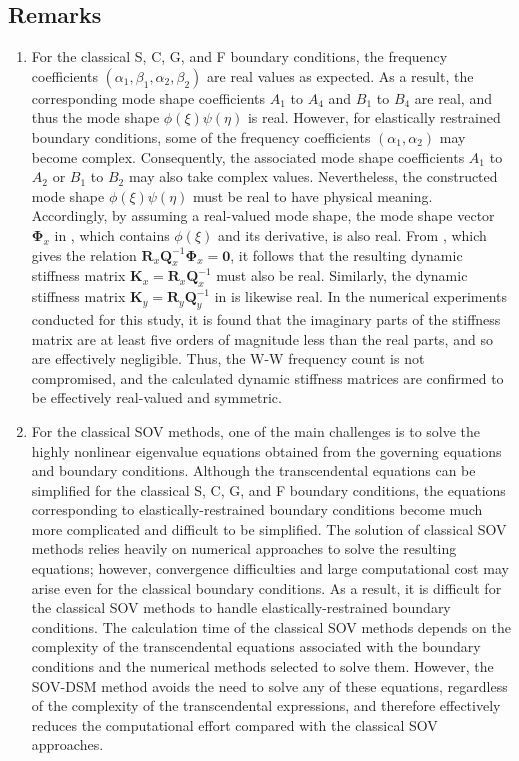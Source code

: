 \documentclass[preprint,12pt,number]{elsarticle}
\begin{document}
\subsection{Remarks}
\begin{enumerate}[label=(\roman*)]
	\item For the classical S, C, G, and F boundary conditions, the frequency coefficients $(\alpha_{1}, \beta_{1}, \alpha_{2}, \beta_{2})$ are real values as expected. 
	As a result, the corresponding mode shape coefficients $A_{1}$ to $A_{4}$ and $B_{1}$ to $B_{4}$ are real, and thus the mode shape $\phi(\xi)\psi(\eta)$ is real.
	However, for elastically restrained boundary conditions, some of the frequency coefficients $(\alpha_{1}, \alpha_{2})$ may become complex. 
	Consequently, the associated mode shape coefficients $A_{1}$ to $A_{2}$ or $B_{1}$ to $B_{2}$ may also take complex values.
	Nevertheless, the constructed mode shape $\phi(\xi)\psi(\eta)$ must be real to have physical meaning. 
	Accordingly, by assuming a real-valued mode shape, the mode shape vector $\mathbf{\Phi}_x$ in , which contains $\phi(\xi)$ and its derivative, is also real. 
	From , which gives the relation $\mathbf{R}_x \mathbf{Q}_x^{-1}\mathbf{\Phi}_x = \mathbf{0}$, it follows that the resulting dynamic stiffness matrix $\mathbf{K}_x = \mathbf{R}_x \mathbf{Q}_x^{-1}$ must also be real. 
	Similarly, the dynamic stiffness matrix $\mathbf{K}_y = \mathbf{R}_y \mathbf{Q}_y^{-1}$ in  is likewise real.
    In the numerical experiments conducted for this study, it is found that the imaginary parts of the stiffness matrix are at least five orders of magnitude less than the real parts, and so are effectively negligible.
    Thus, the W-W frequency count is not compromised, and the calculated dynamic stiffness matrices are confirmed to be effectively real-valued and symmetric.
	
	\item For the classical SOV methods, one of the main challenges is to solve the highly nonlinear eigenvalue equations obtained from the governing equations and boundary conditions. 
	Although the transcendental equations can be simplified for the classical S, C, G, and F boundary conditions, the equations corresponding to elastically-restrained boundary conditions become much more complicated and difficult to be simplified. 
	The solution of classical SOV methods relies heavily on numerical approaches to solve the resulting equations; however, convergence difficulties and large computational cost may arise even for the classical boundary conditions. 
	As a result, it is difficult for the classical SOV methods to handle elastically-restrained boundary conditions. 
	The calculation time of the classical SOV methods depends on the complexity of the transcendental equations associated with the boundary conditions and the numerical methods selected to solve them. 
	However, the SOV-DSM method avoids the need to solve any of these equations, regardless of the complexity of the transcendental expressions, and therefore effectively reduces the computational effort compared with the classical SOV approaches.
	

\end{enumerate}
\end{document}
